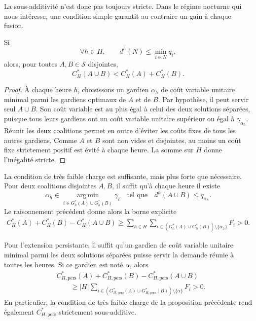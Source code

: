 La sous-additivité n'est donc pas toujours stricte. Dans le régime nocturne
qui nous intéresse, une condition simple garantit au contraire un gain à
chaque fusion.
\begin{proposition}
\label{cor:sousadd_stricte_faible_trafic}
Si
\[
    \forall h\in H,\qquad
    d^h(N)\leqslant\min_{i\in N}q_i,
\]
alors, pour toutes \(A,B\in\mathcal S\) disjointes,
\[
    C_H^*(A\cup B)<C_H^*(A)+C_H^*(B).
\]
\end{proposition}

\begin{proof}
À chaque heure \(h\), choisissons un gardien \(\alpha_h\) de coût variable
unitaire minimal parmi les gardiens optimaux de \(A\) et de \(B\). Par
hypothèse, il peut servir seul \(A\cup B\). Son coût variable est au plus égal
à celui des deux solutions séparées, puisque tous leurs gardiens ont un coût
variable unitaire supérieur ou égal à \(\gamma_{\alpha_h}\). Réunir les deux
coalitions permet en outre d'éviter les coûts fixes de tous les autres
gardiens. Comme \(A\) et \(B\) sont non vides et disjointes, au moins un coût
fixe strictement positif est évité à chaque heure. La somme sur \(H\) donne
l'inégalité stricte.
\end{proof}

\begin{remarque}
\label{prop:sousadd_stricte_locale}
La condition de très faible charge est suffisante, mais plus forte que nécessaire.
Pour deux coalitions disjointes \(A,B\), il suffit qu'à chaque heure il existe
\[
    \alpha_h\in
    \operatorname*{arg\,min}_{i\in G_h^*(A)\cup G_h^*(B)}\gamma_i
    \quad\text{tel que}\quad
    d^h(A\cup B)\leqslant q_{\alpha_h}.
\]
Le raisonnement précédent donne alors la borne explicite
\[
\begin{aligned}
    C_H^*(A)+C_H^*(B)-C_H^*(A\cup B)
    \geqslant
    \sum_{h\in H}
    \sum_{i\in(G_h^*(A)\cup G_h^*(B))\setminus\{\alpha_h\}}F_i
    >0.
\end{aligned}
\]
\end{remarque}

\begin{remarque}
Pour l'extension persistante, il suffit qu'un gardien de coût variable
unitaire minimal parmi les deux solutions séparées puisse servir la demande
réunie à toutes les heures. Si ce gardien est noté \(\alpha\), alors
\[
\begin{aligned}
&C_{H,\mathrm{pers}}^*(A)+C_{H,\mathrm{pers}}^*(B)
-C_{H,\mathrm{pers}}^*(A\cup B)\\
&\qquad\geqslant
|H|\sum_{i\in
(G_{H,\mathrm{pers}}^*(A)\cup G_{H,\mathrm{pers}}^*(B))
\setminus\{\alpha\}}F_i>0.
\end{aligned}
\]
En particulier, la condition de très faible charge de la proposition précédente rend
également \(C_{H,\mathrm{pers}}^*\) strictement sous-additive.
\end{remarque}

